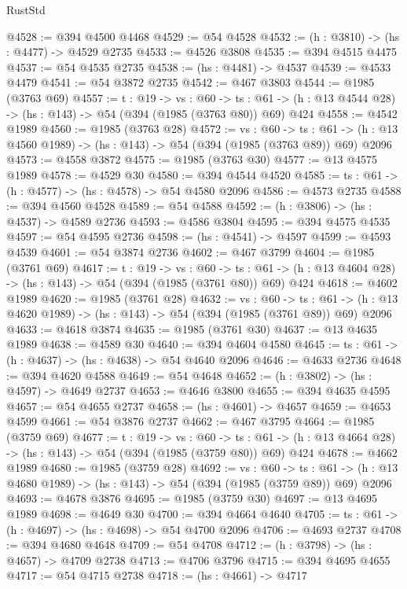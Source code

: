 \begin{lexlean}{RustStd}
\begin{coremodule}
{\begin{coremodule}
{{{{{{{{{{@4528 := @394 @4500 @4468
@4529 := @54 @4528
@4532 := (h : @3810) -> (hs : @4477) -> @4529 @2735
@4533 := @4526 @3808
@4535 := @394 @4515 @4475
@4537 := @54 @4535 @2735
@4538 := (hs : @4481) -> @4537
@4539 := @4533 @4479
@4541 := @54 @3872 @2735
@4542 := @467 @3803
@4544 := @1985 (@3763 @69)
@4557 := {t : @19} ->
  {vs : @60} ->
  {ts : @61} -> (h : @13 @4544 @28) -> (hs : @143) -> @54 (@394 (@1985 (@3763 @80)) @69) @424
@4558 := @4542 @1989
@4560 := @1985 (@3763 @28)
@4572 := {vs : @60} ->
  {ts : @61} -> (h : @13 @4560 @1989) -> (hs : @143) -> @54 (@394 (@1985 (@3763 @89)) @69) @2096
@4573 := @4558 @3872
@4575 := @1985 (@3763 @30)
@4577 := @13 @4575 @1989
@4578 := @4529 @30
@4580 := @394 @4544 @4520
@4585 := {ts : @61} -> (h : @4577) -> (hs : @4578) -> @54 @4580 @2096
@4586 := @4573 @2735
@4588 := @394 @4560 @4528
@4589 := @54 @4588
@4592 := (h : @3806) -> (hs : @4537) -> @4589 @2736
@4593 := @4586 @3804
@4595 := @394 @4575 @4535
@4597 := @54 @4595 @2736
@4598 := (hs : @4541) -> @4597
@4599 := @4593 @4539
@4601 := @54 @3874 @2736
@4602 := @467 @3799
@4604 := @1985 (@3761 @69)
@4617 := {t : @19} ->
  {vs : @60} ->
  {ts : @61} -> (h : @13 @4604 @28) -> (hs : @143) -> @54 (@394 (@1985 (@3761 @80)) @69) @424
@4618 := @4602 @1989
@4620 := @1985 (@3761 @28)
@4632 := {vs : @60} ->
  {ts : @61} -> (h : @13 @4620 @1989) -> (hs : @143) -> @54 (@394 (@1985 (@3761 @89)) @69) @2096
@4633 := @4618 @3874
@4635 := @1985 (@3761 @30)
@4637 := @13 @4635 @1989
@4638 := @4589 @30
@4640 := @394 @4604 @4580
@4645 := {ts : @61} -> (h : @4637) -> (hs : @4638) -> @54 @4640 @2096
@4646 := @4633 @2736
@4648 := @394 @4620 @4588
@4649 := @54 @4648
@4652 := (h : @3802) -> (hs : @4597) -> @4649 @2737
@4653 := @4646 @3800
@4655 := @394 @4635 @4595
@4657 := @54 @4655 @2737
@4658 := (hs : @4601) -> @4657
@4659 := @4653 @4599
@4661 := @54 @3876 @2737
@4662 := @467 @3795
@4664 := @1985 (@3759 @69)
@4677 := {t : @19} ->
  {vs : @60} ->
  {ts : @61} -> (h : @13 @4664 @28) -> (hs : @143) -> @54 (@394 (@1985 (@3759 @80)) @69) @424
@4678 := @4662 @1989
@4680 := @1985 (@3759 @28)
@4692 := {vs : @60} ->
  {ts : @61} -> (h : @13 @4680 @1989) -> (hs : @143) -> @54 (@394 (@1985 (@3759 @89)) @69) @2096
@4693 := @4678 @3876
@4695 := @1985 (@3759 @30)
@4697 := @13 @4695 @1989
@4698 := @4649 @30
@4700 := @394 @4664 @4640
@4705 := {ts : @61} -> (h : @4697) -> (hs : @4698) -> @54 @4700 @2096
@4706 := @4693 @2737
@4708 := @394 @4680 @4648
@4709 := @54 @4708
@4712 := (h : @3798) -> (hs : @4657) -> @4709 @2738
@4713 := @4706 @3796
@4715 := @394 @4695 @4655
@4717 := @54 @4715 @2738
@4718 := (hs : @4661) -> @4717
}}}}}}}}}}
\end{coremodule}}
\end{coremodule}
\end{lexlean}
